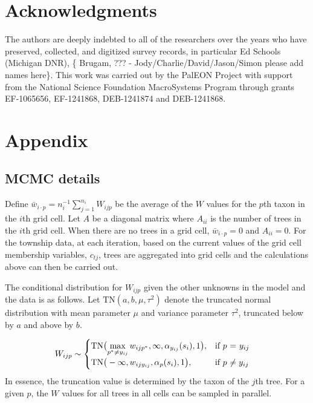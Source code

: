 \documentclass[12pt]{article}\usepackage[]{graphicx}\usepackage[]{color}
\begin{document}
\section*{Acknowledgments}

The authors are deeply indebted to all of the researchers over the
years who have preserved, collected, and digitized survey records,
in particular Ed Schools (Michigan DNR), \{ Brugam, ??? - Jody/Charlie/David/Jason/Simon
please add names here\}. This work was carried out by the PalEON Project
with support from the National Science Foundation MacroSystems Program
through grants EF-1065656, EF-1241868, DEB-1241874 and DEB-1241868. 






\section{Appendix}


\subsection{MCMC details}

Define $\bar{w}_{i\cdot p}=n_{i}^{-1}{\displaystyle \sum_{j=1}^{n_{i}}W_{ijp}}$
be the average of the $W$ values for the $p$th taxon in the $i$th
grid cell. Let $A$ be a diagonal matrix where $A_{ii}$ is the number
of trees in the $i$th grid cell. When there are no trees in a grid
cell, $\bar{w}_{i\cdot p}=0$ and $A_{ii}=0$. For the township data,
at each iteration, based on the current values of the grid cell membership
variables, $c_{tj}$, trees are aggregated into grid cells and the
calculations above can then be carried out.

The conditional distribution for $W_{ijp}$ given the other unknowns
in the model and the data is as follows. Let $\mbox{TN}(a,b,\mu,\tau^{2})$
denote the truncated normal distribution with mean parameter $\mu$
and variance parameter $\tau^{2}$, truncated below by $a$ and above
by $b$. 

\begin{align}
W_{ijp} & \sim\begin{cases}
\mbox{TN}\big({\displaystyle \max_{p^{*}\neq y_{ij}}w_{ijp^{*}},\infty,\alpha_{y_{ij}}(s_{i}),1\big),} & \mbox{if }p\mbox{ = \ensuremath{y_{ij}}}\\
\mbox{TN}\big(-\infty,w_{ijy_{ij}},\alpha_{p}(s_{i}),1\big), & \mbox{if }p\mbox{ \ensuremath{\neq y_{ij}}}
\end{cases}\label{sampW}
\end{align}
In essence, the truncation value is determined by the taxon of the
$j$th tree. For a given $p$, the $W$ values for all trees in all
cells can be sampled in parallel. 
\end{document}
